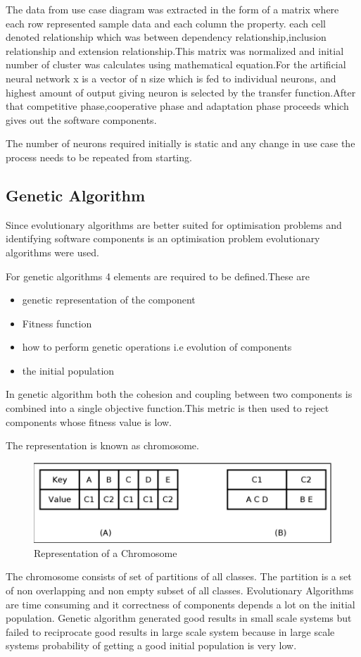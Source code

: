 \documentclass[12pt]{article}
\begin{document}
The data from use case diagram was extracted in the form of a matrix where each row represented sample data and each column the property. each cell denoted relationship  which was between dependency relationship,inclusion relationship and extension relationship.This matrix was normalized and initial number of cluster was calculates using mathematical equation.For the artificial neural network  x is a vector of n size which is fed to individual neurons, and highest amount of output giving neuron is selected by the transfer function.After that competitive phase,cooperative phase and adaptation phase proceeds which gives out the software components.

The number of neurons required initially is static and any change in use case the process needs to be repeated from starting.

\subsection{Genetic Algorithm}
Since evolutionary algorithms are better suited for optimisation problems and identifying software components is an optimisation problem evolutionary algorithms were used\cite{evolution}\cite{genetic}.


For genetic algorithms 4 elements are required to be defined.These are
\begin{itemize}
	\item genetic representation of the component
	\item Fitness function
	\item how to perform genetic operations i.e evolution of components
	\item the initial population
\end{itemize}
In genetic algorithm both the cohesion and coupling between two components is combined into a single objective function.This metric is then used to reject components whose fitness value is low.

The representation is known as chromosome.
\begin{figure}
	\caption{Representation of a Chromosome}
	\includegraphics{chromosome.png}
\end{figure}
The chromosome consists of set of partitions of all classes. The partition is a set of non overlapping and non empty subset of all classes.
Evolutionary Algorithms are time consuming and it correctness of components depends a lot on the initial population.
Genetic algorithm generated good results in small scale systems but failed to reciprocate good results in large scale system because in large scale systems probability of getting a good initial population is very low.
\end{document}
